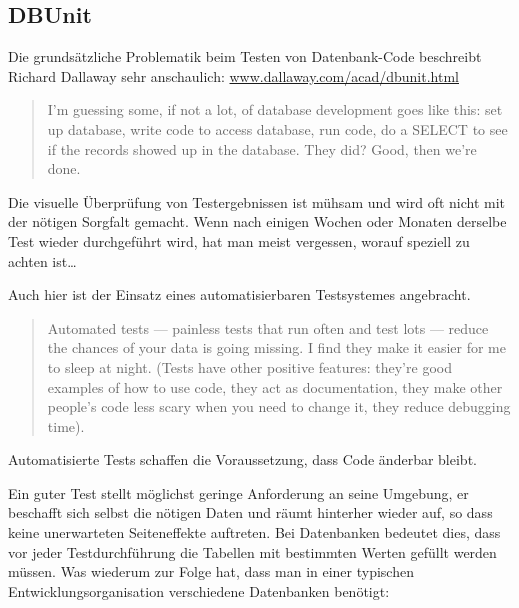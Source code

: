 \subsection{DBUnit}
Die grundsätzliche Problematik beim Testen von Datenbank-Code
beschreibt Richard Dallaway sehr anschaulich:
\href{http://www.dallaway.com/acad/dbunit.html}
{www.dallaway.com/acad/dbunit.html}
\begin{quote}
I'm guessing some, if not a lot, of database development goes like
this: set up database, write code to access database, run code, do a
SELECT to see if the records showed up in the database. They did?
Good, then we're done.
\end{quote}
Die visuelle Überprüfung von Testergebnissen ist mühsam und wird oft
nicht mit der nötigen Sorgfalt gemacht. Wenn nach einigen Wochen oder
Monaten derselbe Test wieder durchgeführt wird, hat man meist
vergessen, worauf speziell zu achten ist\ldots

\newslide
Auch hier ist der
Einsatz eines automatisierbaren Testsystemes
angebracht.

\begin{quote}
Automated tests — painless tests that run often and test lots — reduce
the chances of your data is going missing. I find they make it easier
for me to sleep at night. (Tests have other positive features: they're
good examples of how to use code, they act as documentation, they make
other people's code less scary when you need to change it, they reduce
debugging time).
\end{quote}

Automatisierte Tests schaffen die Voraussetzung, dass Code
änderbar bleibt.

\newslide
Ein guter Test stellt möglichst geringe Anforderung an seine Umgebung,
er beschafft sich selbst die nötigen Daten und räumt hinterher wieder
auf, so dass keine unerwarteten Seiteneffekte auftreten. Bei
Datenbanken bedeutet dies, dass vor jeder Testdurchführung die Tabellen mit
bestimmten Werten gefüllt werden müssen. Was wiederum zur Folge hat,
dass man in einer typischen Entwicklungsorganisation verschiedene
Datenbanken benötigt:

